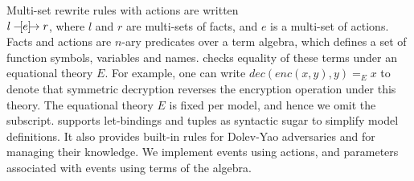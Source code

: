 Multi-set rewrite rules with actions are written\\ $ l \ifarrow[e] r $,
where $l$ and $r$ are multi-sets of facts, and $e$ is a multi-set of actions.
%
Facts and actions are $n$-ary predicates over a term algebra, which defines a
set of function symbols, variables and names.
%
\mTamarin{} checks equality of these terms under an equational theory $E$.
%
For example, one can write $ dec(enc(x,y),y) =_E x $
to denote that symmetric decryption reverses the encryption operation under
this theory.
%
The equational theory $E$ is fixed per model, and hence we omit the subscript.
%
\mTamarin{} supports let-bindings and tuples as syntactic sugar to simplify
model definitions.
%
It also provides built-in rules for Dolev-Yao adversaries and for
managing their knowledge.
%
We implement events using actions, and parameters associated with events using
terms of the algebra.
%

%

%

